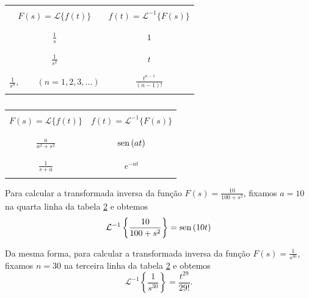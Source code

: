 \begin{table}
\begin{small}
\begin{center}
\begin{tabular}{|c|c|}
\hline &\\
$\displaystyle F(s)=\mathcal{L }\{f(t)\} $&$\displaystyle  f(t)=\mathcal{L }^{-1}\{F(s)\}$ \\&\\ 
\hline &\\
$\displaystyle \frac{1}{s} $&$\displaystyle  1$ \\ &\\
\hline &\\
$\displaystyle \frac{1}{s^2} $&$\displaystyle  t$ \\ &\\
\hline &\\
$\displaystyle \frac{1}{s^n}, \qquad (n=1,2,3,...) $&$\displaystyle  \frac{t^{n-1}}{(n-1)!}$ \\ &\\
\hline
\end{tabular}
\begin{tabular}{|c|c|}
\hline &\\
$\displaystyle F(s)=\mathcal{L }\{f(t)\} $&$\displaystyle  f(t)=\mathcal{L }^{-1}\{F(s)\}$ \\&\\ 
\hline &\\
$\displaystyle \frac{a}{a^2+s^2} $&$\displaystyle  \operatorname{sen}\,(at)$ \\ &\\
\hline &\\
$\displaystyle \frac{1}{s+a} $&$\displaystyle  e^{ -at}$ \\ &\\
\hline
\end{tabular}
\caption{\label{tab_1}}
\end{center}
\end{small}
\end{table}
\begin{ex}Para calcular a transformada inversa da função $F(s)=\frac{10}{100+s^2}$, fixamos $a=10$ na quarta linha da tabela \ref{tab_1} e obtemos
$$
\mathcal{L }^{-1}\left\{ \frac{10}{100+s^2}\right\}=\operatorname{sen}\,(10t)
$$
\end{ex}
\begin{ex}Da mesma forma, para calcular a transformada inversa da função $F(s)=\frac{1}{s^{30}}$, fixamos $n=30$ na terceira linha da tabela \ref{tab_1} e obtemos
$$
\mathcal{L }^{-1}\left\{ \frac{1}{s^{30}}\right\}=\frac{t^{29}}{29!}.
$$
\end{ex}
